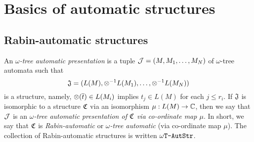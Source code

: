 \iffalse
?? ALT DFN ??

\begin{definition}
\begin{enumerate}
\item A structure FO-interpretable in $\Power_f(\frakT_1)$ is called {\em finite-string automatic}.
\item A structure FO-interpretable in $\Power(\frakT_1)$ is called {\em $\omega$-string automatic}.
\item A structure FO-interpretable in $\Power_f(\frakT_2)$ is called {\em finite-tree automatic}.
\item A structure FO-interpretable in $\Power(\frakT_2)$ is called {\em $\omega$-tree automatic}.
\end{enumerate}
\end{definition}
\fi
\section{Basics of automatic structures} \label{AS:sec:autstr}

\subsection{Rabin-automatic structures}



\begin{definition} \label{AS:dfn:rap} %
An {\em $\omega$-tree automatic presentation} is a tuple ${\mathcal J} = (M, M_1, \dots, M_N)$ of $\omega$-tree automata such that 
\[
\mathfrak{J} = (L(M), \otimes^{-1} L(M_1), \dots, \otimes^{-1} L(M_N)) 
\]
is a structure, namely, $\otimes(\mbox{$\overline {t}$}) \in L(M_i)$ implies $t_j \in L(M)$ for each $j \leq r_i$.
If $\mathfrak{J}$ is isomorphic to a structure $\mathfrak{C}$ via an isomorphism $\mu:L(M) \to \mathbb{C}$, then we say that ${\mathcal J}$ is an 
 {\em $\omega$-tree automatic presentation of $\mathfrak{C}$ via co-ordinate map $\mu$}. In short, we say that $\mathfrak{C}$ is \emph{Rabin-automatic} or \emph{$\omega$-tree automatic} (via co-ordinate map $\mu$). The collection of Rabin-automatic structures is written $\mbox{\tt $\omega$T-AutStr}$.
\end{definition}

